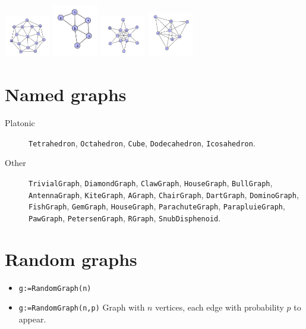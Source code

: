 \documentclass[11pt]{article}
\begin{document}
\begin{multicols}{3}
\begin{itemize}
\includegraphics[width=2cm]{wheel.png} \includegraphics[width=2cm]{fan.png} \includegraphics[width=2cm]{sun.png} \includegraphics[width=2cm]{spiky.png}
\end{itemize}

\section{Named graphs}
\label{sec:org0852a63}
\begin{description}
\item[{Platonic}] \texttt{Tetrahedron}, \texttt{Octahedron}, \texttt{Cube}, \texttt{Dodecahedron}, \texttt{Icosahedron}.
\item[{Other}] \texttt{TrivialGraph}, \texttt{DiamondGraph}, \texttt{ClawGraph},
\texttt{HouseGraph}, \texttt{BullGraph}, \texttt{AntennaGraph}, \texttt{KiteGraph},
\texttt{AGraph}, \texttt{ChairGraph}, \texttt{DartGraph}, \texttt{DominoGraph},
\texttt{FishGraph}, \texttt{GemGraph}, \texttt{HouseGraph}, \texttt{ParachuteGraph},
\texttt{ParapluieGraph}, \texttt{PawGraph}, \texttt{PetersenGraph}, \texttt{RGraph},
\texttt{SnubDisphenoid}.
\end{description}
\section{Random graphs}
\label{sec:orgd2f50b0}

\begin{itemize}
\item \texttt{g:=RandomGraph(n)}
\item \texttt{g:=RandomGraph(n,p)} Graph with \(n\) vertices, each edge with
probability \(p\) to appear.
\end{itemize}


\end{multicols}
\end{document}
